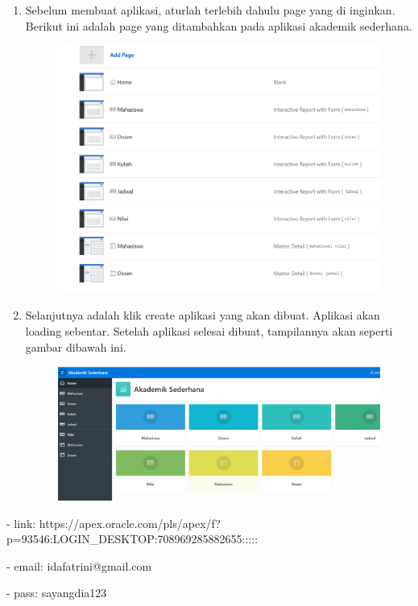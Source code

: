 \begin{enumerate}
    \item Sebelum membuat aplikasi, aturlah terlebih dahulu page yang di inginkan. Berikut ini adalah page yang ditambahkan pada aplikasi akademik sederhana.

\begin{figure}[!htbp]
    \centering
    \includegraphics[scale=0.4]{figure/page.png}
    \label{penanda}
\end{figure}

    \item Selanjutnya adalah klik create aplikasi yang akan dibuat. Aplikasi akan loading sebentar. Setelah aplikasi selesai dibuat, tampilannya akan seperti gambar dibawah ini.
    
\begin{figure}[!htbp]
    \centering
    \includegraphics[scale=0.35]{figure/as.png}
    \label{penanda}
\end{figure}
    
\end{enumerate}

- link: https://apex.oracle.com/pls/apex/f?p=93546:LOGIN_DESKTOP:708969285882655:::::

- email: idafatrini@gmail.com 

- pass: sayangdia123